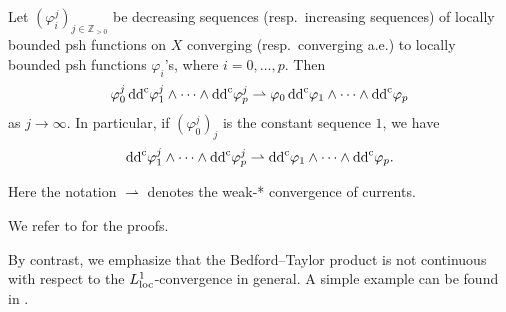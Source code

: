 \begin{theorem}\label{thm:contMA}
    Let $(\varphi_i^j)_{j\in \mathbb{Z}_{>0}}$ be decreasing sequences (resp.\ increasing sequences) of locally bounded psh functions on $X$ converging (resp.\ converging a.e.) to locally bounded psh functions $\varphi_i$'s, where $i=0,\ldots,p$. Then
    \[
    \varphi_0^j\, \mathrm{dd}^{\mathrm{c}} \varphi_1^j\wedge \cdots \wedge \mathrm{dd}^{\mathrm{c}}\varphi_p^j\rightharpoonup \varphi_0\, \mathrm{dd}^{\mathrm{c}} \varphi_1\wedge \cdots \wedge \mathrm{dd}^{\mathrm{c}}\varphi_p
    \]
    as $j\to\infty$. In particular, if $(\varphi_0^j)_j$ is the constant sequence $1$, we have
    \[
    \mathrm{dd}^{\mathrm{c}} \varphi_1^j\wedge \cdots \wedge \mathrm{dd}^{\mathrm{c}}\varphi_p^j\rightharpoonup \mathrm{dd}^{\mathrm{c}} \varphi_1\wedge \cdots \wedge \mathrm{dd}^{\mathrm{c}}\varphi_p.
    \]
\end{theorem}
Here the notation $\rightharpoonup$ denotes the weak-* convergence of currents.

We refer to \cite[Theorem~3.18, Theorem~3.23]{GZ17} for the proofs.

By contrast, we emphasize that the Bedford--Taylor product is not continuous with respect to the $L^1_{\mathrm{loc}}$-convergence in general. A simple example can be found in \cite[Example~3.25]{GZ17}.

